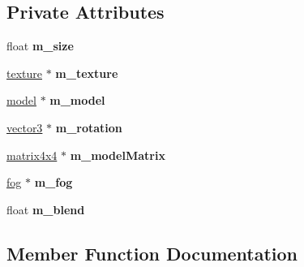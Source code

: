 \subsection*{Private Attributes}
\begin{DoxyCompactItemize}
\item 
\mbox{\label{classflounder_1_1skyboxes_a9941db3103034af65f72f88b9d6d7e9e}} 
float {\bfseries m\+\_\+size}
\item 
\mbox{\label{classflounder_1_1skyboxes_ab9d00a269507281763fbac8916a979ac}} 
\hyperlink{classflounder_1_1texture}{texture} $\ast$ {\bfseries m\+\_\+texture}
\item 
\mbox{\label{classflounder_1_1skyboxes_a1090ce15036dc7c5c68b84a3c92a9826}} 
\hyperlink{classflounder_1_1model}{model} $\ast$ {\bfseries m\+\_\+model}
\item 
\mbox{\label{classflounder_1_1skyboxes_ab8f9b27c128d501100981436b906996b}} 
\hyperlink{classflounder_1_1vector3}{vector3} $\ast$ {\bfseries m\+\_\+rotation}
\item 
\mbox{\label{classflounder_1_1skyboxes_a79adf5d78050dfd8cff097da9e0ec3d5}} 
\hyperlink{classflounder_1_1matrix4x4}{matrix4x4} $\ast$ {\bfseries m\+\_\+model\+Matrix}
\item 
\mbox{\label{classflounder_1_1skyboxes_a52ab1626cd98237d23a2a496a8b0daa8}} 
\hyperlink{classflounder_1_1fog}{fog} $\ast$ {\bfseries m\+\_\+fog}
\item 
\mbox{\label{classflounder_1_1skyboxes_a1a6a8b9a7b1eff6751ad54df90ba5d36}} 
float {\bfseries m\+\_\+blend}
\end{DoxyCompactItemize}


\subsection{Member Function Documentation}
\mbox{\label{classflounder_1_1skyboxes_a07d7f073ed0899414f7f4e1f719e6406}} 
